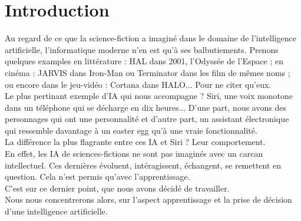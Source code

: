 \documentclass[a4paper]{report}
\begin{document}
  

  \section{Introduction}
    Au regard de ce que la science-fiction a imaginé dans le domaine de l'intelligence artificielle, l'informatique moderne n'en est qu'à ses balbutiements.
    Prenons quelques examples en littérature : HAL dans 2001, l'Odyssée de l'Espace ;
    en cinéma : JARVIS dans Iron-Man ou Terminator dans les film de mêmes noms ; ou encore dans le jeu-vidéo : Cortana dans HALO... Pour ne citer qu'eux. \\
    Le plus pertinant exemple d'IA qui nous accompagne ? Siri, une voix monotone dans un téléphone qui se décharge en dix heures...
    D'une part, nous avons des personnages qui ont une personnalité et d'autre part, un assistant électronique qui ressemble davantage à un easter egg qu'à une vraie fonctionnalité. \\

    \noindent
    La différence la plus flagrante entre ces IA et Siri ? Leur comportement. \\
    En effet, les IA de sciences-fictions ne sont pas imaginés avec un carcan intellectuel.
    Ces dernières évoluent, intéragissent, échangent, se remettent en question. Cela n'est permis qu'avec l'apprentissage. \\

    \noindent
    C'est sur ce dernier point, que nous avons décidé de travailler. \\
    Nous nous concentrerons alors, sur l'aspect apprentissage et la prise de décision d'une intelligence artificielle.

\end{document}
